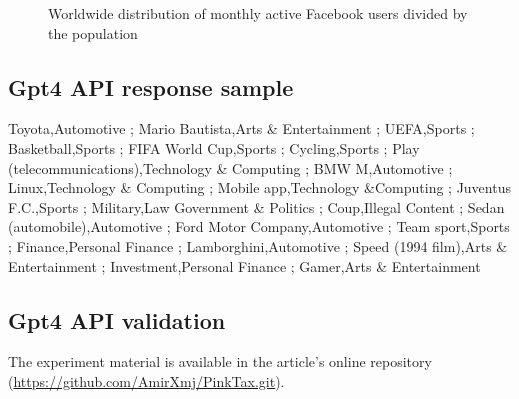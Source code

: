\documentclass[twocolumn]{bmcart}\usepackage{lineno}
\begin{document}
\begin{backmatter}
\begin{figure}[h!]
    \centering
\caption{ Worldwide distribution of monthly active Facebook users divided by the population}
    \label{fig:FBpenetration}
  \end{figure}

\color{blue}



\subsection*{Gpt4 API response sample}

Toyota,Automotive  ; Mario Bautista,Arts \& Entertainment  ; UEFA,Sports  ; Basketball,Sports  ; FIFA World Cup,Sports  ; Cycling,Sports  ; Play (telecommunications),Technology \& Computing  ; BMW M,Automotive  ; Linux,Technology \& Computing  ; Mobile app,Technology \&Computing  ; Juventus F.C.,Sports  ; Military,Law Government \& Politics  ; Coup,Illegal Content  ; Sedan (automobile),Automotive  ; Ford Motor Company,Automotive  ; Team sport,Sports  ; Finance,Personal Finance  ; Lamborghini,Automotive  ; Speed (1994 film),Arts \& Entertainment  ; Investment,Personal Finance  ; Gamer,Arts \& Entertainment


\subsection*{Gpt4 API validation}
The experiment material is available in the article's online repository (\url{https://github.com/AmirXmj/PinkTax.git}). 




\end{backmatter}
\end{document}
